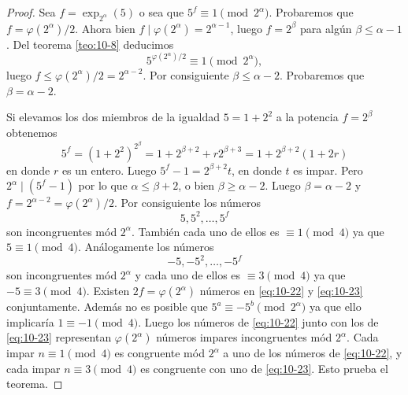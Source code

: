 \documentclass[12pt,a4paper]{book}
\begin{document}
    \begin{proof}
        Sea $f=\exp_{2^{\alpha}}(5)$ o sea que $5^{f}\equiv1\pmod{2^{\alpha}}$. Probaremos que
        $f=\varphi(2^{\alpha})/2$. Ahora bien $f\mid\varphi(2^{\alpha})=2^{\alpha-1}$, luego
        $f=2^{\beta}$ para algún $\beta\leq\alpha-1$. Del teorema \ref{teo:10-8} deducimos
        \begin{equation*}
            5^{\varphi(2^{\alpha})/2}\equiv1\pmod{2^{\alpha}},
        \end{equation*}
        luego $f\leq\varphi(2^{\alpha})/2=2^{\alpha-2}$. Por consiguiente $\beta\leq\alpha-2$.
        Probaremos que $\beta=\alpha-2$.

        Si elevamos los dos miembros de la igualdad $5=1+2^{2}$ a la potencia $f=2^{\beta}$
        obtenemos
        \begin{equation*}
            5^{f}=(1+2^{2})^{2^{\beta}}=1+2^{\beta+2}+r2^{\beta+3}=1+2^{\beta+2}(1+2r)
        \end{equation*}
        en donde $r$ es un entero. Luego $5^{f}-1=2^{\beta+2}t$, en donde $t$ es impar. Pero
        $2^{\alpha}\mid(5^{f}-1)$ por lo que $\alpha\leq\beta+2$, o bien $\beta\geq\alpha-2$.
        Luego $\beta=\alpha-2$ y $f=2^{\alpha-2}=\varphi(2^{\alpha})/2$. Por consiguiente los
        números
        \begin{equation}\label{eq:10-22}
            5,5^{2},\dots,5^{f}
        \end{equation}
        son incongruentes mód $2^{\alpha}$. También cada uno de ellos es $\equiv1\pmod{4}$ ya
        que $5\equiv1\pmod{4}$. Análogamente los números
        \begin{equation}\label{eq:10-23}
            -5,-5^{2},\dots,-5^{f}
        \end{equation}
        son incongruentes mód $2^{\alpha}$ y cada uno de ellos es $\equiv3\pmod{4}$ ya que
        $-5\equiv3\pmod{4}$. Existen $2f=\varphi(2^{\alpha})$ números en \eqref{eq:10-22} y
        \eqref{eq:10-23} conjuntamente. Además no es posible que $5^{a}\equiv-5^{b}\pmod{2^{\alpha}}$
        ya que ello implicaría $1\equiv-1\pmod{4}$. Luego los números de \eqref{eq:10-22}
        junto con los de \eqref{eq:10-23} representan $\varphi(2^{\alpha})$ números impares
        incongruentes mód $2^{\alpha}$. Cada impar $n\equiv1\pmod{4}$ es congruente mód
        $2^{\alpha}$ a uno de los números de \eqref{eq:10-22}, y cada impar $n\equiv3\pmod{4}$
        es congruente con uno de \eqref{eq:10-23}. Esto prueba el teorema.
    \end{proof}
\end{document}
